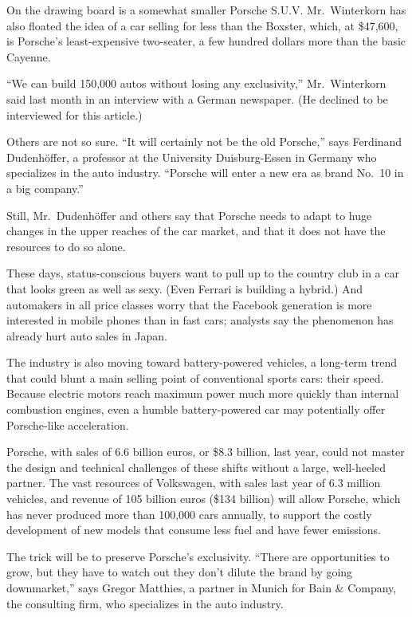 ﻿\documentclass[12pt]{article}
\begin{document}
On the drawing board is a somewhat smaller Porsche S.U.V. Mr.~Winterkorn has also floated the idea
of a car selling for less than the Boxster, which, at \$47,600, is Porsche's least-expensive
two-seater, a few hundred dollars more than the basic Cayenne.

``We can build 150,000 autos without losing any exclusivity,'' Mr.~Winterkorn said last month in an
interview with a German newspaper. (He declined to be interviewed for this article.)

Others are not so sure. ``It will certainly not be the old Porsche,'' says Ferdinand Dudenhöffer, a
professor at the University Duisburg-Essen in Germany who specializes in the auto industry.
``Porsche will enter a new era as brand No.~10 in a big company.''

Still, Mr.~Dudenhöffer and others say that Porsche needs to adapt to huge changes in the upper
reaches of the car market, and that it does not have the resources to do so alone.

These days, status-conscious buyers want to pull up to the country club in a car that looks green as
well as sexy. (Even Ferrari is building a hybrid.) And automakers in all price classes worry that
the Facebook generation is more interested in mobile phones than in fast cars; analysts say the
phenomenon has already hurt auto sales in Japan.

The industry is also moving toward battery-powered vehicles, a long-term trend that could blunt a
main selling point of conventional sports cars: their speed. Because electric motors reach maximum
power much more quickly than internal combustion engines, even a humble battery-powered car may
potentially offer Porsche-like acceleration.

Porsche, with sales of 6.6 billion euros, or \$8.3 billion, last year, could not master the design
and technical challenges of these shifts without a large, well-heeled partner. The vast resources of
Volkswagen, with sales last year of 6.3 million vehicles, and revenue of 105 billion euros (\$134
billion) will allow Porsche, which has never produced more than 100,000 cars annually, to support
the costly development of new models that consume less fuel and have fewer emissions.

The trick will be to preserve Porsche's exclusivity. ``There are opportunities to grow, but they
have to watch out they don't dilute the brand by going downmarket,'' says Gregor Matthies, a partner
in Munich for Bain \& Company, the consulting firm, who specializes in the auto industry.
\end{document}
